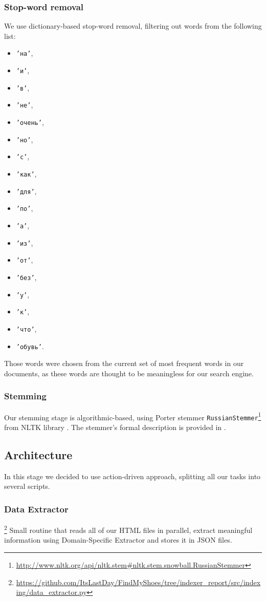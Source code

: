 \subsubsection{Stop-word removal}
We use dictionary-based stop-word removal, filtering out words from the following list:
\begin{itemize}
\item \texttt{'на'},
\item \texttt{'и'},
\item \texttt{'в'},
\item \texttt{'не'},
\item \texttt{'очень'},
\item \texttt{'но'},
\item \texttt{'с'},
\item \texttt{'как'},
\item \texttt{'для'},
\item \texttt{'по'},
\item \texttt{'а'},
\item \texttt{'из'},
\item \texttt{'от'},
\item \texttt{'без'},
\item \texttt{'у'},
\item \texttt{'к'},
\item \texttt{'что'},
\item \texttt{'обувь'}.
\end{itemize}
Those words were chosen from the current set of most frequent words in our documents, 
as these words are thought to be meaningless for our search engine.

\subsubsection{Stemming}
Our stemming stage is algorithmic-based, using Porter stemmer 
\texttt{RussianStemmer}\footnote{\url{http://www.nltk.org/api/nltk.stem\#nltk.stem.snowball.RussianStemmer}} from NLTK library \cite{nltk_book}.
The stemmer's formal description is provided in \cite{RussianStemmer}.

\subsection{Architecture}
In this stage we decided to use action-driven ap\-proach, split\-ting all our tasks into several scripts.

\subsubsection{Data Extractor}
\footnote{\url{https://github.com/ItsLastDay/FindMyShoes/tree/indexer_report/src/indexing/data_extractor.py}}
Small routine that reads all of our HTML files in parallel, extract meaningful information using Domain-Specific Extractor and stores it in JSON files.

